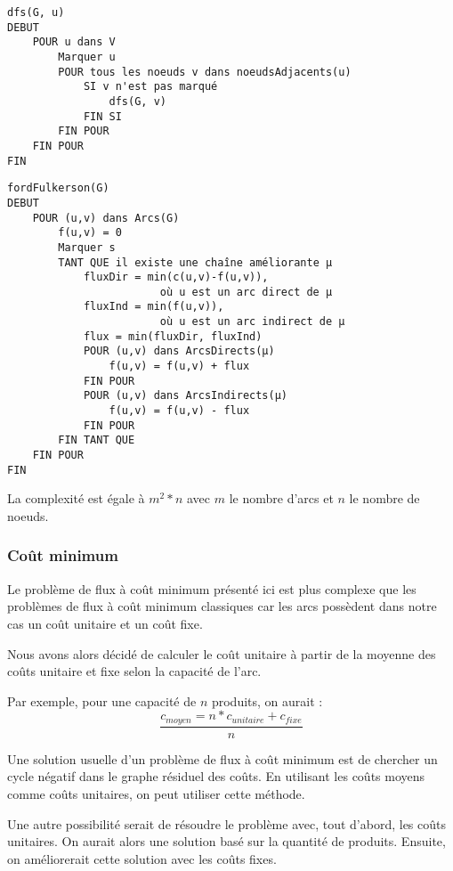 \documentclass[a4paper,12pt]{article}
\begin{document}
\begin{verbatim}
dfs(G, u)
DEBUT
    POUR u dans V
        Marquer u
        POUR tous les noeuds v dans noeudsAdjacents(u)
            SI v n'est pas marqué
                dfs(G, v)
            FIN SI
        FIN POUR
    FIN POUR
FIN
\end{verbatim}

\begin{verbatim}
fordFulkerson(G)
DEBUT
    POUR (u,v) dans Arcs(G)
        f(u,v) = 0
        Marquer s
        TANT QUE il existe une chaîne améliorante µ
            fluxDir = min(c(u,v)-f(u,v)), 
                        où u est un arc direct de µ
            fluxInd = min(f(u,v)),
                        où u est un arc indirect de µ
            flux = min(fluxDir, fluxInd)
            POUR (u,v) dans ArcsDirects(µ)
                f(u,v) = f(u,v) + flux
            FIN POUR
            POUR (u,v) dans ArcsIndirects(µ)
                f(u,v) = f(u,v) - flux
            FIN POUR
        FIN TANT QUE
    FIN POUR
FIN
\end{verbatim}


La complexité est égale à $m^2*n$ avec $m$ le nombre d'arcs et $n$ le nombre de noeuds.

\subsubsection{Coût minimum}

Le problème de flux à coût minimum présenté ici est plus complexe que les problèmes de flux à coût minimum classiques car les arcs possèdent dans notre cas un coût unitaire et un coût fixe.

Nous avons alors décidé de calculer le coût unitaire à partir de la moyenne des coûts unitaire et fixe selon la capacité de l'arc.

Par exemple, pour une capacité de $n$ produits, on aurait :
\begin{equation*}
    \frac{c_{moyen} = n*c_{unitaire}+c_{fixe}}{n}
\end{equation*}

Une solution usuelle d'un problème de flux à coût minimum est de chercher un cycle négatif dans le graphe résiduel des coûts. En utilisant les coûts moyens comme coûts unitaires, on peut utiliser cette méthode.

Une autre possibilité serait de résoudre le problème avec, tout d'abord, les coûts unitaires. On aurait alors une solution basé sur la quantité de produits. Ensuite, on améliorerait cette solution avec les coûts fixes.
\end{document}
